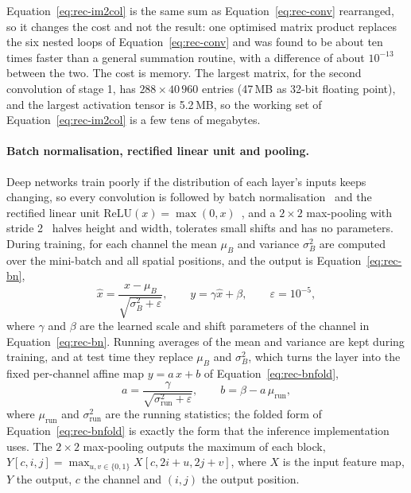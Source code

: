 Equation~\ref{eq:rec-im2col} is the same sum as Equation~\ref{eq:rec-conv} rearranged, so it changes the cost and not the result: one optimised matrix product replaces the six nested loops of Equation~\ref{eq:rec-conv} and was found to be about ten times faster than a general summation routine, with a difference of about $10^{-13}$ between the two.
The cost is memory. The largest matrix, for the second convolution of stage 1, has $288\times40\,960$ entries (47\,MB as 32-bit floating point), and the largest activation tensor is 5.2\,MB, so the working set of Equation~\ref{eq:rec-im2col} is a few tens of megabytes.

\paragraph{Batch normalisation, rectified linear unit and pooling.}
Deep networks train poorly if the distribution of each layer's inputs keeps changing, so every convolution is followed by batch normalisation~\cite{ioffe2015} and the rectified linear unit $\mathrm{ReLU}(x)=\max(0,x)$~\cite{nair2010}, and a $2\times2$ max-pooling with stride 2~\cite{lecun1998} halves height and width, tolerates small shifts and has no parameters.
During training, for each channel the mean $\mu_B$ and variance $\sigma_B^2$ are computed over the mini-batch and all spatial positions, and the output is Equation~\ref{eq:rec-bn},
\begin{equation}
\hat x=\frac{x-\mu_B}{\sqrt{\sigma_B^2+\varepsilon}},\qquad y=\gamma\hat x+\beta,\qquad\varepsilon=10^{-5},
\label{eq:rec-bn}
\end{equation}
where $\gamma$ and $\beta$ are the learned scale and shift parameters of the channel in Equation~\ref{eq:rec-bn}.
Running averages of the mean and variance are kept during training, and at test time they replace $\mu_B$ and $\sigma_B^2$, which turns the layer into the fixed per-channel affine map $y=a\,x+b$ of Equation~\ref{eq:rec-bnfold},
\begin{equation}
a=\frac{\gamma}{\sqrt{\sigma^2_{\mathrm{run}}+\varepsilon}},\qquad b=\beta-a\,\mu_{\mathrm{run}},
\label{eq:rec-bnfold}
\end{equation}
where $\mu_{\mathrm{run}}$ and $\sigma^2_{\mathrm{run}}$ are the running statistics; the folded form of Equation~\ref{eq:rec-bnfold} is exactly the form that the inference implementation uses.
The $2\times2$ max-pooling outputs the maximum of each block, $Y[c,i,j]=\max_{u,v\in\{0,1\}}X[c,2i+u,2j+v]$, where $X$ is the input feature map, $Y$ the output, $c$ the channel and $(i,j)$ the output position.
